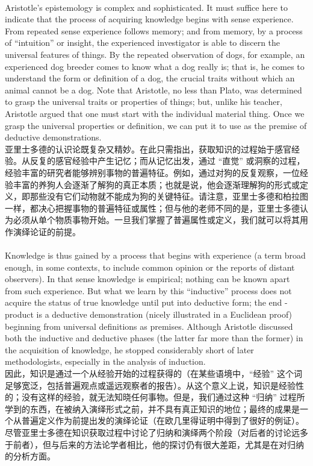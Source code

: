 \documentclass{article}
\begin{document}
\\
Aristotle’s epistemology is complex and sophisticated. It must suffice here to indicate that the process of acquiring knowledge begins with sense experience. From repeated sense experience follows memory; and from memory, by a process of “intuition” or insight, the experienced investigator is able to discern the universal features of things. By the repeated observation of dogs, for example, an experienced dog breeder comes to know what a dog really is; that is, he comes to understand the form or definition of a dog, the crucial traits without which an animal cannot be a dog. Note that Aristotle, no less than Plato, was determined to grasp the universal traits or properties of things; but, unlike his teacher, Aristotle argued that one must start with the individual material thing. Once we grasp the universal properties or definition, we can put it to use as the premise of deductive demonstrations.\\
亚里士多德的认识论既复杂又精妙。在此只需指出，获取知识的过程始于感官经验。从反复的感官经验中产生记忆；而从记忆出发，通过 “直觉” 或洞察的过程，经验丰富的研究者能够辨别事物的普遍特征。例如，通过对狗的反复观察，一位经验丰富的养狗人会逐渐了解狗的真正本质；也就是说，他会逐渐理解狗的形式或定义，即那些没有它们动物就不能成为狗的关键特征。请注意，亚里士多德和柏拉图一样，都决心把握事物的普遍特征或属性；但与他的老师不同的是，亚里士多德认为必须从单个物质事物开始。一旦我们掌握了普遍属性或定义，我们就可以将其用作演绎论证的前提。\\

\\
Knowledge is thus gained by a process that begins with experience (a term broad enough, in some contexts, to include common opinion or the reports of distant observers). In that sense knowledge is empirical; nothing can be known apart from such experience. But what we learn by this “inductive” process does not acquire the status of true knowledge until put into deductive form; the end - product is a deductive demonstration (nicely illustrated in a Euclidean proof) beginning from universal definitions as premises. Although Aristotle discussed both the inductive and deductive phases (the latter far more than the former) in the acquisition of knowledge, he stopped considerably short of later methodologists, especially in the analysis of induction.\\
因此，知识是通过一个从经验开始的过程获得的（在某些语境中，“经验” 这个词足够宽泛，包括普遍观点或遥远观察者的报告）。从这个意义上说，知识是经验性的；没有这样的经验，就无法知晓任何事物。但是，我们通过这种 “归纳” 过程所学到的东西，在被纳入演绎形式之前，并不具有真正知识的地位；最终的成果是一个从普遍定义作为前提出发的演绎论证（在欧几里得证明中得到了很好的例证）。尽管亚里士多德在知识获取过程中讨论了归纳和演绎两个阶段（对后者的讨论远多于前者），但与后来的方法论学者相比，他的探讨仍有很大差距，尤其是在对归纳的分析方面。\\
\end{document}
